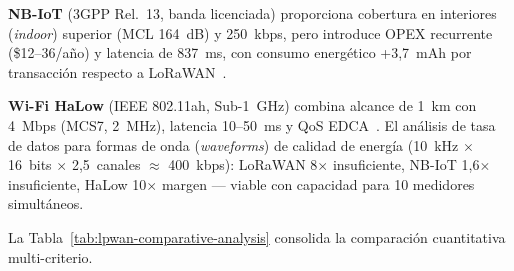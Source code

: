 \textbf{NB-IoT} (3GPP Rel.~13, banda licenciada) proporciona cobertura en interiores (\emph{indoor}) superior (MCL 164~dB) y 250~kbps, pero introduce OPEX recurrente (\$12--36/año) y latencia de 837~ms, con consumo energético +3,7~mAh por transacción respecto a LoRaWAN~\cite{ugwuanyiSurveyIoTDeveloping2021,zhengPerformancePowerConsumption2018}.

\textbf{Wi-Fi HaLow} (IEEE 802.11ah, Sub-1~GHz) combina alcance de 1~km con 4~Mbps (MCS7, 2~MHz), latencia 10--50~ms y QoS EDCA~\cite{zhengPerformancePowerConsumption2018}. El análisis de tasa de datos para formas de onda (\emph{waveforms}) de calidad de energía (10~kHz $\times$ 16~bits $\times$ 2,5~canales $\approx$ 400~kbps): LoRaWAN 8$\times$ insuficiente, NB-IoT 1,6$\times$ insuficiente, HaLow 10$\times$ margen --- viable con capacidad para 10 medidores simultáneos.

La Tabla~\ref{tab:lpwan-comparative-analysis} consolida la comparación cuantitativa multi-criterio.

